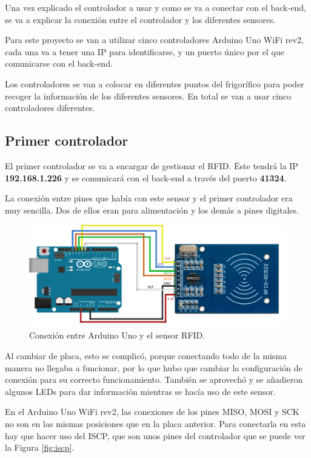 Una vez explicado el controlador a usar y como se va a conectar con el back-end, se va a explicar la conexión entre el controlador y los diferentes sensores.

Para este proyecto se van a utilizar cinco controladores Arduino Uno WiFi rev2, cada una va a tener una IP para identificarse, y un puerto único por el que comunicarse con el back-end.

Los controladores se van a colocar en diferentes puntos del frigorífico para poder recoger la información de los diferentes sensores. En total se van a usar cinco controladores diferentes.

\subsection{Primer controlador}

El primer controlador se va a encargar de gestionar el RFID. Ëste tendrá la IP \textbf{192.168.1.226} y se comunicará con el back-end a través del puerto \textbf{41324}.

La conexión entre pines que había con este sensor y el primer controlador era muy sencilla. Dos de ellos eran para alimentación y los demás a pines digitales.

\begin{figure}[h] 
    \centering
    \includegraphics[width=.80\textwidth]{capitulos/capitulo6/ardunorfid.png}
    \caption{Conexión entre Arduino Uno y el sensor RFID.}
    \label{fig:unorfid}
\end{figure}

\newpage
Al cambiar de placa, esto se complicó, porque conectando todo de la misma manera no llegaba a funcionar, por lo que hubo que cambiar la configuración de conexión para su correcto funcionamiento. También se aprovechó y se añadieron algunos LEDs para dar información mientras se hacía uso de este sensor.

En el Arduino Uno WiFi rev2, las conexiones de los pines MISO, MOSI y SCK no son en las mismas posiciones que en la placa anterior. Para conectarla en esta hay que hacer uso del ISCP\cite{thirtyfirst}, que son unos pines del controlador que se puede ver la Figura \ref{fig:iscp}.

